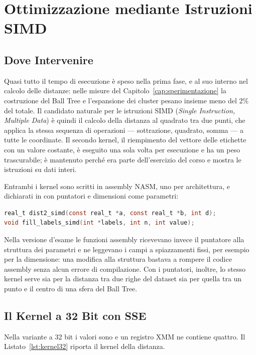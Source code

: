 \chapter{Ottimizzazione mediante Istruzioni SIMD}
\label{cap:simd}

\section{Dove Intervenire}

Quasi tutto il tempo di esecuzione è speso nella prima fase, e al suo interno nel calcolo delle distanze: nelle misure del Capitolo~\ref{cap:sperimentazione} la costruzione del Ball Tree e l'espansione dei cluster pesano insieme meno del 2\% del totale. Il candidato naturale per le istruzioni SIMD (\emph{Single Instruction, Multiple Data}) è quindi il calcolo della distanza al quadrato tra due punti, che applica la stessa sequenza di operazioni --- sottrazione, quadrato, somma --- a tutte le coordinate. Il secondo kernel, il riempimento del vettore delle etichette con un valore costante, è eseguito una sola volta per esecuzione e ha un peso trascurabile; è mantenuto perché era parte dell'esercizio del corso e mostra le istruzioni su dati interi.

Entrambi i kernel sono scritti in assembly NASM, uno per architettura, e dichiarati in  con puntatori e dimensioni come parametri:

\begin{lstlisting}[language=C]
real_t dist2_simd(const real_t *a, const real_t *b, int d);
void fill_labels_simd(int *labels, int n, int value);
\end{lstlisting}

Nella versione d'esame le funzioni assembly ricevevano invece il puntatore alla struttura dei parametri e ne leggevano i campi a spiazzamenti fissi, per esempio \codice{[rdi+40]} per la dimensione: una modifica alla struttura bastava a rompere il codice assembly senza alcun errore di compilazione. Con i puntatori, inoltre, lo stesso kernel serve sia per la distanza tra due righe del dataset sia per quella tra un punto e il centro di una sfera del Ball Tree.

\section{Il Kernel a 32 Bit con SSE}

Nella variante a 32 bit i valori sono  e un registro XMM ne contiene quattro. Il Listato~\ref{lst:kernel32} riporta il kernel della distanza.

